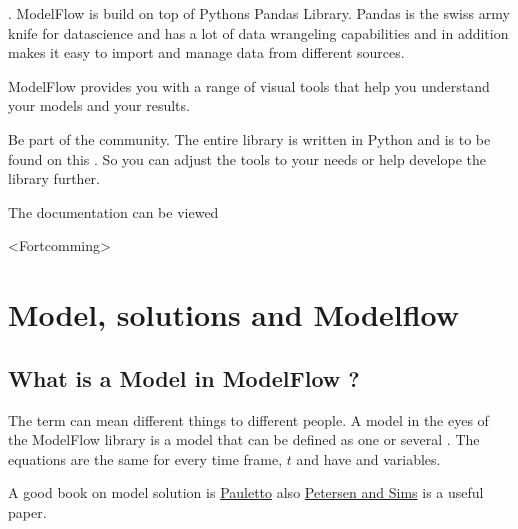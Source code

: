 \documentclass[letterpaper,10pt,english]{jupyterBook}
\begin{document}
\sphinxAtStartPar
{}.
ModelFlow is build on top of Pythons Pandas Library. Pandas is the swiss army knife for datascience and has a lot of data wrangeling capabilities and in addition makes it easy to import and manage data from different sources.

\sphinxAtStartPar
{} ModelFlow provides you with a range of visual tools that help you understand your models and your results.

\sphinxAtStartPar
{}
Be part of the community. The entire library is written in Python and is to be found on this   . So you can adjust the tools to your needs or help develope the library further.

\sphinxAtStartPar
The documentation can be viewed 

\sphinxAtStartPar
{}
<Fortcomming>

\sphinxstepscope


\part{Model, solutions and Modelflow}

\sphinxstepscope


\chapter{What is a Model in ModelFlow ?}
\label{\detokenize{content/notebooks/intro/model and solution:what-is-a-model-in-modelflow}}\label{\detokenize{content/notebooks/intro/model and solution::doc}}
\sphinxAtStartPar
The term  can mean different things to different people. A model in the eyes of the ModelFlow library is a  model that can be defined as one or several . The equations are the same for every time frame, \(t\) and  have  and  variables.

\sphinxAtStartPar
A good book on model solution is \hyperlink{cite.content/litterature:id8}{Pauletto} also  \hyperlink{cite.content/litterature:id7}{Petersen and Sims} is a useful paper.
\end{document}
